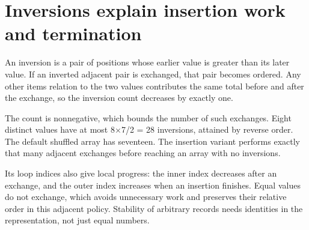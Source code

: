 \section{Inversions explain insertion work and
  termination}\label{009-sorting-visualizer-p06-inversions-explain-insertion-work-and-termination}

An inversion is a pair of positions whose earlier value is greater than
its later value. If an inverted adjacent pair is exchanged, that pair
becomes ordered. Any other item\textquotesingle s relation to the two
values contributes the same total before and after the exchange, so the
inversion count decreases by exactly one.

The count is nonnegative, which bounds the number of such exchanges.
Eight distinct values have at most 8\ensuremath{\times}7/2 = 28 inversions, attained by
reverse order. The default shuffled array has seventeen. The insertion
variant performs exactly that many adjacent exchanges before reaching an
array with no inversions.

Its loop indices also give local progress: the inner index decreases
after an exchange, and the outer index increases when an insertion
finishes. Equal values do not exchange, which avoids unnecessary work
and preserves their relative order in this adjacent policy. Stability of
arbitrary records needs identities in the representation, not just equal
numbers.
